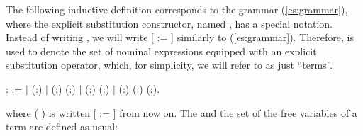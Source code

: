 The following inductive definition corresponds to the grammar (\ref{es:grammar}), where the explicit substitution constructor, named , has a special notation. Instead of writing    , we will write [ := ]  similarly to (\ref{es:grammar}). Therefore,  is used to denote the set of nominal expressions equipped with an explicit substitution operator, which, for simplicity, we will refer to as just ``terms''. 
\begin{coqdoccode}
\coqdocemptyline
\coqdocnoindent
{}  :  :=\coqdoceol
\coqdocnoindent
\ensuremath{|}  (:)\coqdoceol
\coqdocnoindent
\ensuremath{|}  (:) (:)\coqdoceol
\coqdocnoindent
\ensuremath{|}  (:) (:)\coqdoceol
\coqdocnoindent
\ensuremath{|}  (:) (:) (:).\coqdoceol
\end{coqdoccode}
\noindent where (   ) is written [ := ] from now on. The  and the set  of the free variables of a term are defined as usual: 
